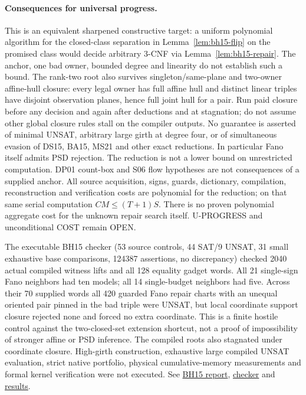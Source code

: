 \documentclass[11pt]{article}
\begin{document}
\paragraph{Consequences for universal progress.}
This is an equivalent sharpened constructive target: a uniform polynomial algorithm for the closed-class separation in Lemma~\ref{lem:bh15-flip} on the promised class would decide arbitrary 3-CNF via Lemma~\ref{lem:bh15-repair}. The anchor, one bad owner, bounded degree and linearity do not establish such a bound. The rank-two root also survives singleton/same-plane and two-owner affine-hull closure: every legal owner has full affine hull and distinct linear triples have disjoint observation planes, hence full joint hull for a pair. Run paid closure before any decision and again after deductions and at stagnation; do not assume other global closure rules stall on the compiler outputs. No guarantee is asserted of minimal UNSAT, arbitrary large girth at degree four, or of simultaneous evasion of DS15, BA15, MS21 and other exact reductions. In particular Fano itself admits PSD rejection. The reduction is not a lower bound on unrestricted computation. DP01 count-box and S06 flow hypotheses are not consequences of a supplied anchor. All source acquisition, signs, guards, dictionary, compilation, reconstruction and verification costs are polynomial for the reduction; on that same serial computation $CM\le(T+1)S$. There is no proven polynomial aggregate cost for the unknown repair search itself. U-PROGRESS and unconditional COST remain OPEN.

The executable BH15 checker (53 source controls, 44 SAT/9 UNSAT, 31 small exhaustive base comparisons, 124387 assertions, no discrepancy) checked 2040 actual compiled witness lifts and all 128 equality gadget words. All 21 single-sign Fano neighbors had ten models; all 14 single-budget neighbors had five. Across their 70 supplied words all 420 guarded Fano repair charts with an unequal oriented pair pinned in the bad triple were UNSAT, but local coordinate support closure rejected none and forced no extra coordinate. This is a finite hostile control against the two-closed-set extension shortcut, not a proof of impossibility of stronger affine or PSD inference. The compiled roots also stagnated under coordinate closure. High-girth construction, exhaustive large compiled UNSAT evaluation, strict native portfolio, physical cumulative-memory measurements and formal kernel verification were not executed. See \href{https://github.com/j15marti/pnp/commit/215ee73bacfe81230134628df31a2210b20ba0c6}{BH15 report}, \href{https://github.com/j15marti/pnp/commit/cd77cdd83b970034e8febc0f535dbdfa09dce21c}{checker} and \href{https://github.com/j15marti/pnp/commit/ceda301431e0e259cdfe1b34f49cae24d714fc6f}{results}.
\end{document}
